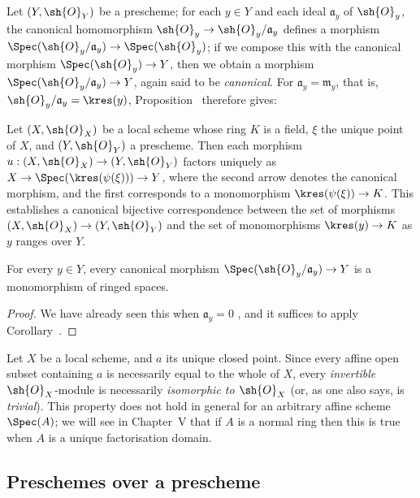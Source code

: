 Let $(Y,\sh{O}_Y)$ be a prescheme;
for each $y\in Y$ and each ideal $\mathfrak{a}_y$ of $\sh{O}_y$, the canonical homomorphism $\sh{O}_y\to\sh{O}_y/\mathfrak{a}_y$ defines a morphism $\Spec(\sh{O}_y/\mathfrak{a}_y)\to\Spec(\sh{O}_y)$;
if we compose this with the canonical morphism $\Spec(\sh{O}_y)\to Y$, then we obtain a morphism $\Spec(\sh{O}_y/\mathfrak{a}_y)\to Y$, again said to be \textit{canonical}.
For $\mathfrak{a}_y=\mathfrak{m}_y$, that is, $\sh{O}_y/\mathfrak{a}_y=\kres(y)$, Proposition~ therefore gives:

\begin{corollary}[2.4.6]
\label{I.2.4.6}
Let $(X,\sh{O}_X)$ be a local scheme whose ring $K$ is a field, $\xi$ the unique point of $X$, and $(Y,\sh{O}_Y)$ a prescheme.
Then each morphism $u:(X,\sh{O}_X)\to(Y,\sh{O}_Y)$ factors uniquely as $X\to\Spec(\kres(\psi(\xi)))\to Y$, where the second arrow denotes the canonical morphism, and the first corresponds to a monomorphism $\kres(\psi(\xi))\to K$.
This establishes a canonical bijective correspondence between the set of morphisms $(X,\sh{O}_X)\to (Y,\sh{O}_Y)$ and the set of monomorphisms $\kres(y)\to K$ as $y$ ranges over $Y$.
\end{corollary}

\begin{corollary}[2.4.7]
\label{I.2.4.7}
For every $y\in Y$, every canonical morphism $\Spec(\sh{O}_y/\mathfrak{a}_y)\to Y$ is a monomorphism of ringed spaces.
\end{corollary}

\begin{proof}
We have already seen this when $\mathfrak{a}_y=0$ , and it suffices to apply Corollary~.
\end{proof}

\begin{remark}[2.4.8]
\label{I.2.4.8}
Let $X$ be a local scheme, and $a$ its unique closed point.
Since every affine open subset containing $a$ is necessarily equal to the whole of $X$, every \emph{invertible} $\sh{O}_X$-module  is necessarily \emph{isomorphic to $\sh{O}_X$} (or, as one also says, is \emph{trivial}).
This property does not hold in general for an arbitrary affine scheme $\Spec(A)$;
we will see in Chapter~V that if $A$ is a normal ring then this is true when $A$ is a unique factorisation domain.
\end{remark}

\subsection{Preschemes over a prescheme}
\label{subsection:I.2.5}

